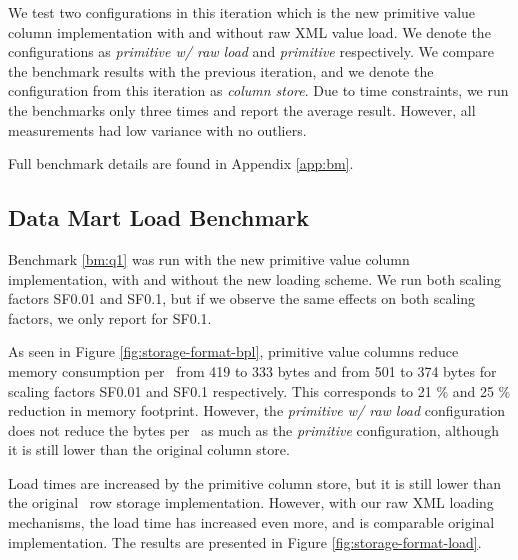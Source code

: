 We test two configurations in this iteration which is the new primitive value column implementation with and without raw XML value load. We denote the configurations as \textit{primitive w/ raw load} and \textit{primitive} respectively. We compare the benchmark results with the previous iteration, and we denote the configuration from this iteration as \textit{column store}. Due to time constraints, we run the benchmarks only three times and report the average result. However, all measurements had low variance with no outliers.

Full benchmark details are found in Appendix \ref{app:bm}.

\subsection{Data Mart Load Benchmark}
\label{storage-format:q1}

Benchmark \ref{bm:q1} was run with the new primitive value column implementation, with and without the new loading scheme. We run both scaling factors SF0.01 and SF0.1, but if we observe the same effects on both scaling factors, we only report for SF0.1.

As seen in Figure \ref{fig:storage-format-bpl}, primitive value columns reduce memory consumption per \lineitem~from 419 to 333 bytes and from 501 to 374 bytes for scaling factors SF0.01 and SF0.1 respectively. This corresponds to 21 \% and 25 \% reduction in memory footprint. However, the \textit{primitive w/ raw load} configuration does not reduce the bytes per \lineitem~as much as the \textit{primitive} configuration, although it is still lower than the original column store.


Load times are increased by the primitive column store, but it is still lower than the original \gap~row storage implementation. However, with our raw XML loading mechanisms, the load time has increased even more, and is comparable original implementation. The results are presented in Figure \ref{fig:storage-format-load}. 

